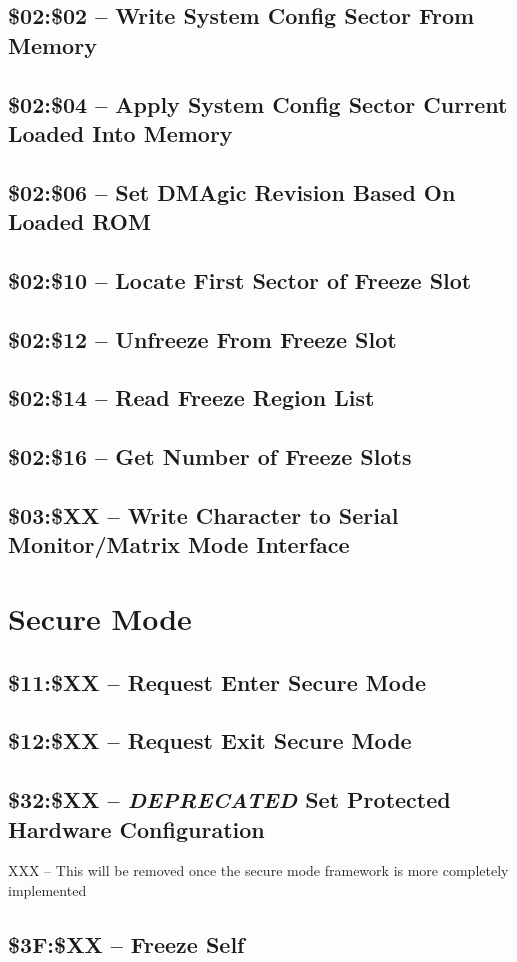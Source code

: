 \subsection{\$02:\$02 -- Write System Config Sector From Memory}
\subsection{\$02:\$04 -- Apply System Config Sector Current Loaded Into Memory}
\subsection{\$02:\$06 -- Set DMAgic Revision Based On Loaded ROM}

\subsection{\$02:\$10 -- Locate First Sector of Freeze Slot}
\subsection{\$02:\$12 -- Unfreeze From Freeze Slot}
\subsection{\$02:\$14 -- Read Freeze Region List}
\subsection{\$02:\$16 -- Get Number of Freeze Slots}

\subsection{\$03:\$XX -- Write Character to Serial Monitor/Matrix Mode Interface}

\section{Secure Mode}

\subsection{\$11:\$XX -- Request Enter Secure Mode}
\subsection{\$12:\$XX -- Request Exit Secure Mode}
\subsection{\$32:\$XX -- {\em DEPRECATED} Set Protected Hardware Configuration}

XXX -- This will be removed once the secure mode framework is more completely implemented

\subsection{\$3F:\$XX -- Freeze Self}

